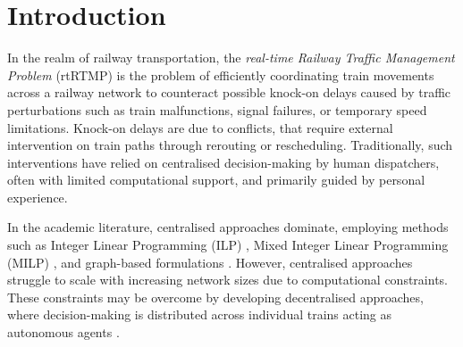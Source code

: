 \section{Introduction}

In the realm of railway transportation, the \emph{real-time Railway Traffic Management Problem} (rtRTMP) \cite{10.1007/978-3-319-24264-4_45,PelMarPesRod15:ieeetits} is the problem of efficiently coordinating train movements across a railway network to counteract possible knock-on delays caused by traffic perturbations such as train malfunctions, signal failures, or temporary speed limitations. Knock-on delays are due to conflicts, that require external intervention on train paths through rerouting or rescheduling. Traditionally, such interventions have relied on centralised decision-making by human dispatchers, often with limited computational support, and primarily guided by personal experience.

In the academic literature, centralised approaches dominate, employing methods such as Integer Linear Programming (ILP) \cite{Caimi2012,Meng2014,TOLETTI2020100173}, Mixed Integer Linear Programming (MILP) \cite{Luan2020,Fischetti2017,PelMarPesRod15:ieeetits,Tornquist2007,LU2022102622,REYNOLDS2022105719,LeuBonCor:2023}, and graph-based formulations \cite{Corman2010,LamMan15,Mascis02,SamDarCorPar17,Bettinelli2017,Rod07}. However, centralised approaches struggle to scale with increasing network sizes due to computational constraints. These constraints may be overcome by developing decentralised approaches, where decision-making is distributed across individual trains acting as autonomous agents \cite{MarPel20:IEEE}. 


